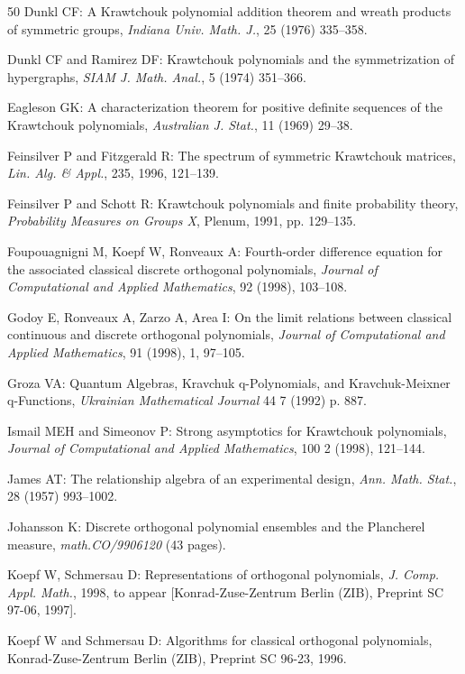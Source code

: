 \begin{thebibliography}{50}
 Dunkl CF: A Krawtchouk polynomial addition theorem and wreath products of symmetric groups, \emph{Indiana Univ. Math. J.}, 25 (1976) 335--358.

 Dunkl CF and Ramirez DF: Krawtchouk polynomials and the symmetrization of hypergraphs, \emph{SIAM J. Math. Anal.}, 5 (1974) 351--366.

 Eagleson GK: A characterization theorem for positive definite sequences of the Krawtchouk polynomials, \emph{Australian J. Stat.}, 11 (1969) 29--38.

 Feinsilver P and Fitzgerald R: The spectrum of symmetric Krawtchouk matrices, \emph{Lin. Alg. \& Appl.}, 235, 1996, 121--139.

 Feinsilver P and Schott R: Krawtchouk polynomials and finite probability theory, \emph{Probability Measures on Groups X}, Plenum, 1991, pp. 129--135.

 Foupouagnigni M, Koepf W, Ronveaux A: Fourth-order difference equation for the associated classical discrete orthogonal polynomials, \emph{Journal of Computational and Applied Mathematics}, 92 (1998), 103--108.

 Godoy E, Ronveaux A, Zarzo A, Area I: On the limit relations between classical continuous and discrete orthogonal polynomials, \emph{Journal of Computational and Applied Mathematics}, 91 (1998), 1, 97--105.

 Groza VA: Quantum Algebras, Kravchuk q-Polynomials, and Kravchuk-Meixner q-Functions, \emph{Ukrainian Mathematical Journal} 44 7 (1992) p. 887.

 Ismail MEH and Simeonov P: Strong asymptotics for Krawtchouk polynomials, \emph{Journal of Computational and Applied Mathematics}, 100 2 (1998), 121--144.

 James AT: The relationship algebra of an experimental design, \emph{Ann. Math. Stat.}, 28 (1957) 993--1002.

 Johansson K: Discrete orthogonal polynomial ensembles and the Plancherel measure, \emph{math.CO/9906120} (43 pages).

 Koepf W, Schmersau D: Representations of orthogonal polynomials, \emph{J. Comp. Appl. Math.}, 1998, to appear [Konrad-Zuse-Zentrum Berlin (ZIB), Preprint SC 97-06, 1997].

 Koepf W and Schmersau D: Algorithms for classical orthogonal polynomials, Konrad-Zuse-Zentrum Berlin (ZIB), Preprint SC 96-23, 1996.


\end{thebibliography}
